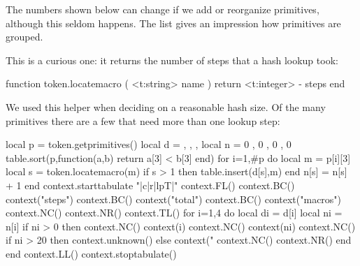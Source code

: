 The numbers shown below can change if we add or reorganize primitives, although
this seldom happens. The list gives an impression how primitives are grouped.

\showengineprimitives[2]

This is a curious one: it returns the number of steps that a hash lookup took:

\starttyping[option=LUA]
function token.locatemacro ( <t:string> name )
    return <t:integer> - steps
end
\stoptyping

We used this helper when deciding on a reasonable hash size. Of the many
primitives there are a few that need more than one lookup step:

\startluacode
local p = token.getprimitives()
local d = { { }, { }, { }, { } }
local n = {  0 ,  0 ,  0 ,  0  }
table.sort(p,function(a,b) return a[3] < b[3] end)
for i=1,#p do
    local m = p[i][3]
    local s = token.locatemacro(m)
    if s > 1 then
        table.insert(d[s],m)
    end
    n[s] = n[s] + 1
end
context.starttabulate { "|c|r|lpT|" }
context.FL()
context.BC() context("steps")
context.BC() context("total")
context.BC() context("macros")
context.NC() context.NR()
context.TL()
for i=1,4 do
    local di = d[i]
    local ni = n[i]
    if ni > 0 then
        context.NC() context(i)
        context.NC() context(ni)
        context.NC() if ni > 20 then context.unknown() else context("%
        context.NC() context.NR()
    end
end
context.LL()
context.stoptabulate()
\stopluacode

\stopsubsection

\stopsection

\stopdocument



